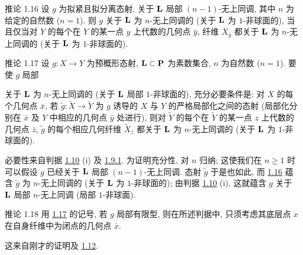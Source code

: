 \begin{enonce*}{推论 1.16}
设 $g$ 为拟紧且拟分离态射, 关于 $\mathbf{L}$ 局部 $(n-1)$-无上同调, 其中 $n$ 为给定的自然数 (\resp $n=1$). 则 $g$ 关于 $\mathbf{L}$ 为 $n$-无上同调的 (\resp 关于 $\mathbf{L}$ 为 $1$-非球面的), 当且仅当对 $Y$ 的每个在 $Y$ 的某一点 $y$ 上代数的几何点 $\bar{y}$, 纤维 $X_{\bar{y}}$ 都关于 $\mathbf{L}$ 为 $n$-无上同调的 (\resp 关于 $\mathbf{L}$ 为 $1$-非球面的).
\end{enonce*}

\begin{enonce*}{推论 1.17}
设 $g:X\rightarrow Y$ 为预概形态射, $\mathbf{L}\subset \mathbf{P}$ 为素数集合, $n$ 为自然数 (\resp $n=1$). 要使 $g$ 局部

关于 $\mathbf{L}$ 为 $n$-无上同调的 (\resp 关于 $\mathbf{L}$ 局部 $1$-非球面的), 充分必要条件是: 对 $X$ 的每个几何点 $\bar{x}$, 若 $\widetilde{g}:\widetilde{X}\rightarrow
\widetilde{Y}$ 为 $g$ 诱导的 $X$ 与 $Y$ 的严格局部化之间的态射 (局部化分别在 $\bar{x}$ 及 $Y$ 中相应的几何点 $\bar{y}$ 处进行), 则对 $\widetilde{Y}$ 的每个在 $\widetilde{Y}$ 的某一点 $z$ 上代数的几何点 $\bar{z}$, $\widetilde{g}$ 的每个相应几何纤维 $\widetilde{X}_{\bar{z}}$ 都关于 $\mathbf{L}$ 为 $n$-无上同调的 (\resp 关于 $\mathbf{L}$ 为 $1$-非球面的).
\end{enonce*}

必要性来自判据 \hyperref[XV.prop1.10]{1.10} (i) 及 \hyperref[XV.cor1.9.1]{1.9.1}. 为\pageoriginale 证明充分性, 对 $n$ 归纳; 这使我们在 $n\geq 1$ 时可以假设 $g$ 已经关于 $\mathbf{L}$ 局部 $(n-1)$-无上同调. 态射 $\widetilde{g}$ 于是也如此, 而 \hyperref[XV.cor1.16]{1.16} 蕴含 $\widetilde{g}$ 为 $n$-无上同调的 (\resp 关于 $\mathbf{L}$ 为 $1$-非球面的); 由判据 \hyperref[XV.prop1.10]{1.10} (i), 这就蕴含 $g$ 关于 $\mathbf{L}$ 局部 $n$-无上同调 (\resp 局部 $1$-非球面).

\begin{enonce*}{推论 1.18}
用 \hyperref[XV.cor1.17]{1.17} 的记号, 若 $g$ 局部有限型, 则在所述判据中, 只须考虑其底层点 $x$ 在自身纤维中为闭点的几何点 $\bar{x}$.
\end{enonce*}

这来自刚才的证明及 \hyperref[XV.cor1.12]{1.12}.

